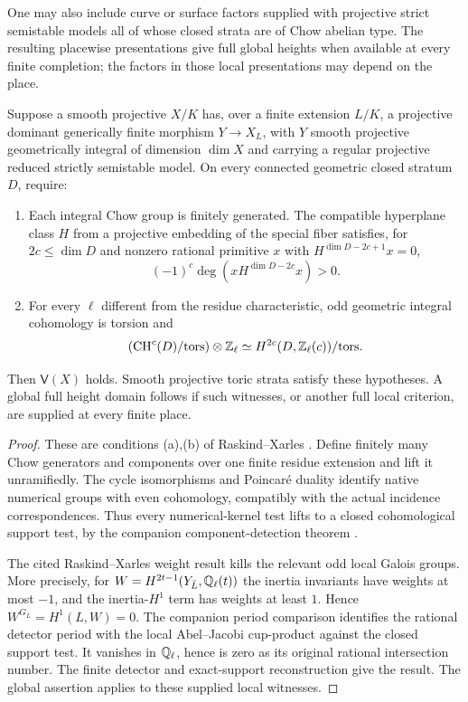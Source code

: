 One may also include curve or surface factors supplied with
projective strict semistable models all of whose closed strata are
of Chow abelian type. The resulting placewise presentations give
full global heights when available at every finite completion;
the factors in those local presentations may depend on the place.

\begin{theorem}\label{thm:totally-degenerate}
Suppose a smooth projective $X/K$ has, over a finite extension
$L/K$, a projective dominant generically finite morphism
$Y\to X_L$, with $Y$ smooth projective geometrically integral
of dimension $\dim X$ and carrying a regular projective reduced
strictly semistable model. On every
connected geometric closed stratum $D$, require:
\begin{enumerate}[label=\textup{(\roman*)}]
\item Each integral Chow group is finitely generated. The compatible
hyperplane class $H$ from a projective embedding of the special
fiber satisfies, for $2c\leq\dim D$ and nonzero rational primitive
$x$ with $H^{\dim D-2c+1}x=0$,
\[
 (-1)^c\deg(xH^{\dim D-2c}x)>0.
\]
\item For every $\ell$ different from the residue characteristic,
odd geometric integral cohomology is torsion and
\[
 (\operatorname{CH}^c(D)/\mathrm{tors})\otimes\mathbb Z_\ell
 \simeq H^{2c}(D,\mathbb Z_\ell(c))/\mathrm{tors}.
\]
\end{enumerate}
Then $\mathsf V(X)$ holds. Smooth projective toric strata satisfy
these hypotheses. A global full height domain follows if such
witnesses, or another full local criterion, are supplied at every
finite place.
\end{theorem}

\begin{proof}
These are conditions (a),(b) of Raskind--Xarles
\cite[Definition 1]{RX}. Define finitely many Chow generators and
components over one finite residue extension and lift it
unramifiedly. The cycle isomorphisms and Poincar\'e duality identify
native numerical groups with even cohomology, compatibly with the
actual incidence correspondences. Thus every numerical-kernel
test lifts to a closed cohomological support test, by the companion
component-detection theorem \cite{InternalDegenerate}.

The cited Raskind--Xarles weight result kills the relevant odd
local Galois groups. More precisely, for
$W=H^{2t-1}(Y_{\bar L},\mathbb Q_\ell(t))$ the inertia invariants have
weights at most $-1$, and the inertia-$H^1$ term has weights at
least $1$. Hence $W^{G_L}=H^1(L,W)=0$. The companion period
comparison identifies the rational detector period with the
local Abel--Jacobi cup-product against the closed support test.
It vanishes in $\mathbb Q_\ell$, hence is zero as its original rational
intersection number. The finite detector and exact-support
reconstruction give the result. The global assertion applies
 to these supplied local witnesses.
\end{proof}

